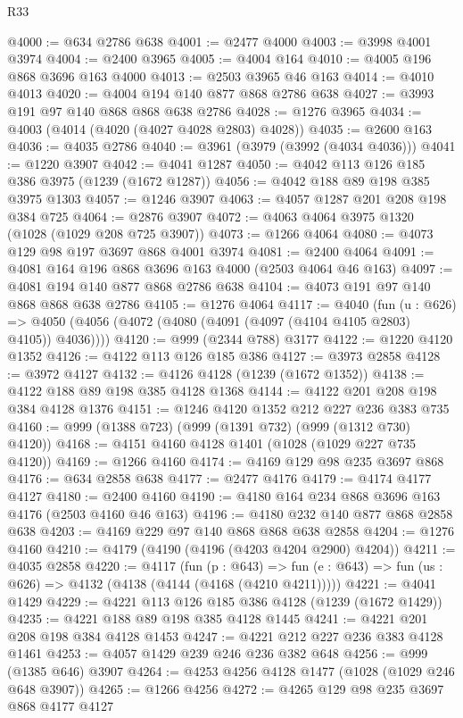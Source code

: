 \begin{lexlean}{R33}
\begin{coremodule}
@4000 := @634 @2786 @638
@4001 := @2477 @4000
@4003 := @3998 @4001 @3974
@4004 := @2400 @3965
@4005 := @4004 @164
@4010 := @4005 @196 @868 @3696 @163 @4000
@4013 := @2503 @3965 @46 @163
@4014 := @4010 @4013
@4020 := @4004 @194 @140 @877 @868 @2786 @638
@4027 := @3993 @191 @97 @140 @868 @868 @638 @2786
@4028 := @1276 @3965
@4034 := @4003 (@4014 (@4020 (@4027 @4028 @2803) @4028))
@4035 := @2600 @163
@4036 := @4035 @2786
@4040 := @3961 (@3979 (@3992 (@4034 @4036)))
@4041 := @1220 @3907
@4042 := @4041 @1287
@4050 := @4042 @113 @126 @185 @386 @3975 (@1239 (@1672 @1287))
@4056 := @4042 @188 @89 @198 @385 @3975 @1303
@4057 := @1246 @3907
@4063 := @4057 @1287 @201 @208 @198 @384 @725
@4064 := @2876 @3907
@4072 := @4063 @4064 @3975 @1320 (@1028 (@1029 @208 @725 @3907))
@4073 := @1266 @4064
@4080 := @4073 @129 @98 @197 @3697 @868 @4001 @3974
@4081 := @2400 @4064
@4091 := @4081 @164 @196 @868 @3696 @163 @4000 (@2503 @4064 @46 @163)
@4097 := @4081 @194 @140 @877 @868 @2786 @638
@4104 := @4073 @191 @97 @140 @868 @868 @638 @2786
@4105 := @1276 @4064
@4117 := @4040
    (fun (u : @626) =>
    @4050 (@4056 (@4072 (@4080 (@4091 (@4097 (@4104 @4105 @2803) @4105)) @4036))))
@4120 := @999 (@2344 @788) @3177
@4122 := @1220 @4120 @1352
@4126 := @4122 @113 @126 @185 @386
@4127 := @3973 @2858
@4128 := @3972 @4127
@4132 := @4126 @4128 (@1239 (@1672 @1352))
@4138 := @4122 @188 @89 @198 @385 @4128 @1368
@4144 := @4122 @201 @208 @198 @384 @4128 @1376
@4151 := @1246 @4120 @1352 @212 @227 @236 @383 @735
@4160 := @999 (@1388 @723) (@999 (@1391 @732) (@999 (@1312 @730) @4120))
@4168 := @4151 @4160 @4128 @1401 (@1028 (@1029 @227 @735 @4120))
@4169 := @1266 @4160
@4174 := @4169 @129 @98 @235 @3697 @868
@4176 := @634 @2858 @638
@4177 := @2477 @4176
@4179 := @4174 @4177 @4127
@4180 := @2400 @4160
@4190 := @4180 @164 @234 @868 @3696 @163 @4176 (@2503 @4160 @46 @163)
@4196 := @4180 @232 @140 @877 @868 @2858 @638
@4203 := @4169 @229 @97 @140 @868 @868 @638 @2858
@4204 := @1276 @4160
@4210 := @4179 (@4190 (@4196 (@4203 @4204 @2900) @4204))
@4211 := @4035 @2858
@4220 := @4117
    (fun (p : @643) =>
    fun (e : @643) => fun (us : @626) => @4132 (@4138 (@4144 (@4168 (@4210 @4211)))))
@4221 := @4041 @1429
@4229 := @4221 @113 @126 @185 @386 @4128 (@1239 (@1672 @1429))
@4235 := @4221 @188 @89 @198 @385 @4128 @1445
@4241 := @4221 @201 @208 @198 @384 @4128 @1453
@4247 := @4221 @212 @227 @236 @383 @4128 @1461
@4253 := @4057 @1429 @239 @246 @236 @382 @648
@4256 := @999 (@1385 @646) @3907
@4264 := @4253 @4256 @4128 @1477 (@1028 (@1029 @246 @648 @3907))
@4265 := @1266 @4256
@4272 := @4265 @129 @98 @235 @3697 @868 @4177 @4127

\end{coremodule}
\end{lexlean}
